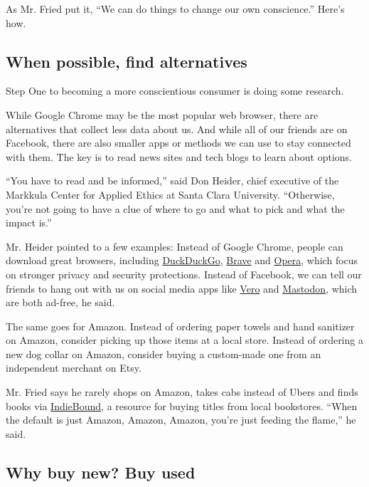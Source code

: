 As Mr. Fried put it, ``We can do things to change our own conscience.''
Here's how.

\hypertarget{when-possible-find-alternatives}{%
\subsection{When possible, find
alternatives}\label{when-possible-find-alternatives}}

Step One to becoming a more conscientious consumer is doing some
research.

While Google Chrome may be the most popular web browser, there are
alternatives that collect less data about us. And while all of our
friends are on Facebook, there are also smaller apps or methods we can
use to stay connected with them. The key is to read news sites and tech
blogs to learn about options.

``You have to read and be informed,'' said Don Heider, chief executive
of the Markkula Center for Applied Ethics at Santa Clara University.
``Otherwise, you're not going to have a clue of where to go and what to
pick and what the impact is.''

Mr. Heider pointed to a few examples: Instead of Google Chrome, people
can download great browsers, including
\href{https://www.nytimes.com/2019/07/15/technology/duckduckgo-private-search.html}{DuckDuckGo},
\href{https://brave.com/}{Brave} and
\href{https://www.opera.com/}{Opera}, which focus on stronger privacy
and security protections. Instead of Facebook, we can tell our friends
to hang out with us on social media apps like
\href{https://vero.co/}{Vero} and
\href{https://joinmastodon.org/}{Mastodon}, which are both ad-free, he
said.

The same goes for Amazon. Instead of ordering paper towels and hand
sanitizer on Amazon, consider picking up those items at a local store.
Instead of ordering a new dog collar on Amazon, consider buying a
custom-made one from an independent merchant on Etsy.

Mr. Fried says he rarely shops on Amazon, takes cabs instead of Ubers
and finds books via \href{https://www.indiebound.org/}{IndieBound}, a
resource for buying titles from local bookstores. ``When the default is
just Amazon, Amazon, Amazon, you're just feeding the flame,'' he said.

\hypertarget{why-buy-new-buy-used}{%
\subsection{Why buy new? Buy used}\label{why-buy-new-buy-used}}

